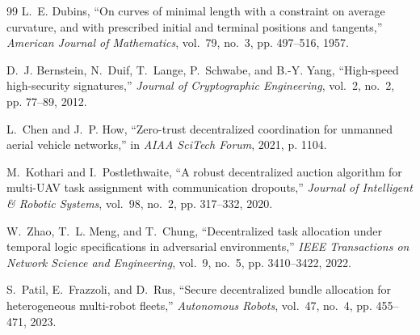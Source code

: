 \documentclass[journal,10pt,twocolumn]{IEEEtran}
\begin{document}
\begin{thebibliography}{99}
L.~E. Dubins, ``On curves of minimal length with a constraint on average curvature, and with prescribed initial and terminal positions and tangents,'' \emph{American Journal of Mathematics}, vol.~79, no.~3, pp. 497--516, 1957.

D.~J. Bernstein, N.~Duif, T.~Lange, P.~Schwabe, and B.-Y. Yang, ``High-speed high-security signatures,'' \emph{Journal of Cryptographic Engineering}, vol.~2, no.~2, pp. 77--89, 2012.

L.~Chen and J.~P. How, ``Zero-trust decentralized coordination for unmanned aerial vehicle networks,'' in \emph{AIAA SciTech Forum}, 2021, p. 1104.

M.~Kothari and I.~Postlethwaite, ``A robust decentralized auction algorithm for multi-UAV task assignment with communication dropouts,'' \emph{Journal of Intelligent \& Robotic Systems}, vol.~98, no.~2, pp. 317--332, 2020.

W.~Zhao, T.~L. Meng, and T.~Chung, ``Decentralized task allocation under temporal logic specifications in adversarial environments,'' \emph{IEEE Transactions on Network Science and Engineering}, vol.~9, no.~5, pp. 3410--3422, 2022.

S.~Patil, E.~Frazzoli, and D.~Rus, ``Secure decentralized bundle allocation for heterogeneous multi-robot fleets,'' \emph{Autonomous Robots}, vol.~47, no.~4, pp. 455--471, 2023.

\end{thebibliography}
\end{document}
